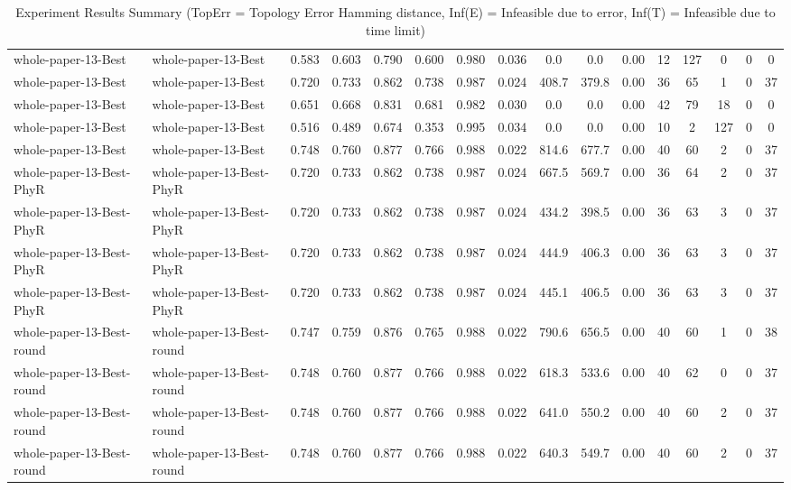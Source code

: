 \begin{table*}[p]
{\begin{tabular}{llcccccccccccccc}
      whole-paper-13-Best & whole-paper-13-Best & 0.583 & 0.603 & 0.790 & 0.600 & 0.980 & 0.036 & 0.0 & 0.0 & 0.00 & 12 & 127 & 0 & 0 & 0 \\
      whole-paper-13-Best & whole-paper-13-Best & 0.720 & 0.733 & 0.862 & 0.738 & 0.987 & 0.024 & 408.7 & 379.8 & 0.00 & 36 & 65 & 1 & 0 & 37 \\
      whole-paper-13-Best & whole-paper-13-Best & 0.651 & 0.668 & 0.831 & 0.681 & 0.982 & 0.030 & 0.0 & 0.0 & 0.00 & 42 & 79 & 18 & 0 & 0 \\
      whole-paper-13-Best & whole-paper-13-Best & 0.516 & 0.489 & 0.674 & 0.353 & 0.995 & 0.034 & 0.0 & 0.0 & 0.00 & 10 & 2 & 127 & 0 & 0 \\
      whole-paper-13-Best & whole-paper-13-Best & 0.748 & 0.760 & 0.877 & 0.766 & 0.988 & 0.022 & 814.6 & 677.7 & 0.00 & 40 & 60 & 2 & 0 & 37 \\
      whole-paper-13-Best-PhyR & whole-paper-13-Best-PhyR & 0.720 & 0.733 & 0.862 & 0.738 & 0.987 & 0.024 & 667.5 & 569.7 & 0.00 & 36 & 64 & 2 & 0 & 37 \\
      whole-paper-13-Best-PhyR & whole-paper-13-Best-PhyR & 0.720 & 0.733 & 0.862 & 0.738 & 0.987 & 0.024 & 434.2 & 398.5 & 0.00 & 36 & 63 & 3 & 0 & 37 \\
      whole-paper-13-Best-PhyR & whole-paper-13-Best-PhyR & 0.720 & 0.733 & 0.862 & 0.738 & 0.987 & 0.024 & 444.9 & 406.3 & 0.00 & 36 & 63 & 3 & 0 & 37 \\
      whole-paper-13-Best-PhyR & whole-paper-13-Best-PhyR & 0.720 & 0.733 & 0.862 & 0.738 & 0.987 & 0.024 & 445.1 & 406.5 & 0.00 & 36 & 63 & 3 & 0 & 37 \\
      whole-paper-13-Best-round & whole-paper-13-Best-round & 0.747 & 0.759 & 0.876 & 0.765 & 0.988 & 0.022 & 790.6 & 656.5 & 0.00 & 40 & 60 & 1 & 0 & 38 \\
      whole-paper-13-Best-round & whole-paper-13-Best-round & 0.748 & 0.760 & 0.877 & 0.766 & 0.988 & 0.022 & 618.3 & 533.6 & 0.00 & 40 & 62 & 0 & 0 & 37 \\
      whole-paper-13-Best-round & whole-paper-13-Best-round & 0.748 & 0.760 & 0.877 & 0.766 & 0.988 & 0.022 & 641.0 & 550.2 & 0.00 & 40 & 60 & 2 & 0 & 37 \\
      whole-paper-13-Best-round & whole-paper-13-Best-round & 0.748 & 0.760 & 0.877 & 0.766 & 0.988 & 0.022 & 640.3 & 549.7 & 0.00 & 40 & 60 & 2 & 0 & 37 \\
      \bottomrule
    \end{tabular}%
  }
  \caption{Experiment Results Summary (TopErr = Topology Error Hamming distance, Inf(E) = Infeasible due to error, Inf(T) = Infeasible due to time limit)}
  \label{tab:experiment-results}
\end{table*}